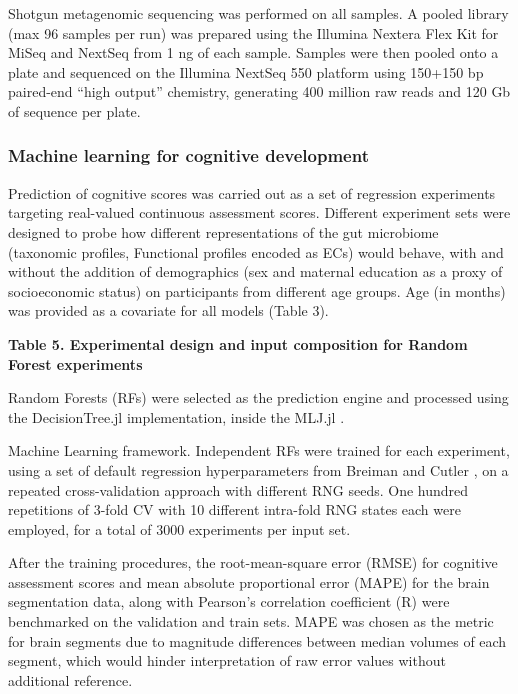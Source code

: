 \documentclass[a4paper]{article}
\begin{document}
Shotgun metagenomic sequencing was performed on all samples. A pooled
library (max 96 samples per run) was prepared using the Illumina Nextera
Flex Kit for MiSeq and NextSeq from 1 ng of each sample. Samples were
then pooled onto a plate and sequenced on the Illumina NextSeq 550
platform using 150+150 bp paired-end ``high output'' chemistry,
generating 400 million raw reads and 120 Gb of sequence per plate.

\subsubsection{Machine learning for cognitive development}

Prediction of cognitive scores was carried out as a set of regression
experiments targeting real-valued continuous assessment scores.
Different experiment sets were designed to probe how different
representations of the gut microbiome (taxonomic profiles, Functional
profiles encoded as ECs) would behave, with and without the addition of
demographics (sex and maternal education as a proxy of socioeconomic
status) on participants from different age groups. Age (in months) was
provided as a covariate for all models (Table 3).

\textbf{Table 5. Experimental design and input composition for Random
Forest experiments}

Random Forests (RFs)
\citep{breimanRandomForests2001}
were selected as the prediction engine and processed using the
DecisionTree.jl \citep{sadeghiDecisionTreeJlJulia2022}
implementation, inside the MLJ.jl \citep{blaomMLJJuliaPackage2020}.

Machine Learning framework. Independent RFs were trained for each
experiment, using a set of default regression hyperparameters from
Breiman and Cutler \citep{breimanRandomForests2001},
on a repeated cross-validation approach with different RNG seeds. One hundred
repetitions of 3-fold CV with 10 different intra-fold RNG states each
were employed, for a total of 3000 experiments per input set.

After the training procedures, the root-mean-square error (RMSE) for
cognitive assessment scores and mean absolute proportional error (MAPE)
for the brain segmentation data, along with Pearson's
correlation coefficient (R) were benchmarked on the validation and train
sets. MAPE was chosen as the metric for brain segments due to magnitude
differences between median volumes of each segment, which would hinder
interpretation of raw error values without additional reference.
\end{document}
